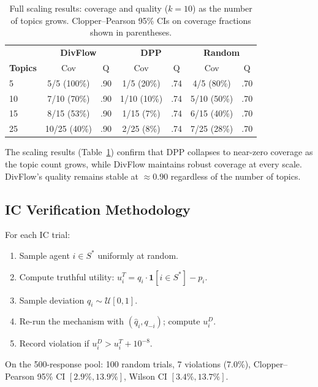 \documentclass[10pt]{article}
\begin{document}
\begin{table}[H]
\centering
\caption{Full scaling results: coverage and quality ($k{=}10$) as the number of topics grows.
Clopper--Pearson 95\% CIs on coverage fractions shown in parentheses.}
\label{tab:scaling-full}
\small
\begin{tabular}{l|cc|cc|cc}
\toprule
& \multicolumn{2}{c|}{\textbf{DivFlow}} & \multicolumn{2}{c|}{\textbf{DPP}} & \multicolumn{2}{c}{\textbf{Random}} \\
\textbf{Topics} & Cov & Q & Cov & Q & Cov & Q \\
\midrule
5  & 5/5 (100\%) & .90 & 1/5 (20\%) & .74 & 4/5 (80\%) & .70 \\
10 & 7/10 (70\%) & .90 & 1/10 (10\%) & .74 & 5/10 (50\%) & .70 \\
15 & 8/15 (53\%) & .90 & 1/15 (7\%) & .74 & 6/15 (40\%) & .70 \\
25 & 10/25 (40\%) & .90 & 2/25 (8\%) & .74 & 7/25 (28\%) & .70 \\
\bottomrule
\end{tabular}
\end{table}

The scaling results (Table~\ref{tab:scaling-full}) confirm that DPP collapses to near-zero coverage as the topic count grows, while DivFlow maintains robust coverage at every scale.
DivFlow's quality remains stable at $\approx 0.90$ regardless of the number of topics.

\subsection{IC Verification Methodology}

For each IC trial:
\begin{enumerate}[leftmargin=*,itemsep=1pt]
\item Sample agent $i \in S^*$ uniformly at random.
\item Compute truthful utility: $u_i^T = q_i \cdot \mathbf{1}[i \in S^*] - p_i$.
\item Sample deviation $\hat{q}_i \sim \mathcal{U}[0, 1]$.
\item Re-run the mechanism with $(\hat{q}_i, q_{-i})$; compute $u_i^D$.
\item Record violation if $u_i^D > u_i^T + 10^{-8}$.
\end{enumerate}

On the 500-response pool: 100 random trials, 7 violations (7.0\%), Clopper--Pearson 95\% CI $[2.9\%, 13.9\%]$, Wilson CI $[3.4\%, 13.7\%]$.
\end{document}
